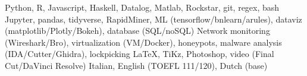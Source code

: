 
\begin{cvskills}
        {Python, R, Javascript, Haskell, Datalog, Matlab, Rockstar, git, regex, bash}
        {Jupyter, pandas, tidyverse, RapidMiner, ML (tensorflow/bnlearn/arules), dataviz (matplotlib/Plotly/Bokeh), database (SQL/noSQL)}
        {Network monitoring (Wireshark/Bro), virtualization (VM/Docker), honeypots, malware analysis (IDA/Cutter/Ghidra), lockpicking}
        {\LaTeX, TiKz, Photoshop, video (Final Cut/DaVinci Resolve)}
        {Italian, English (TOEFL 111/120), Dutch (base)}
\end{cvskills}
